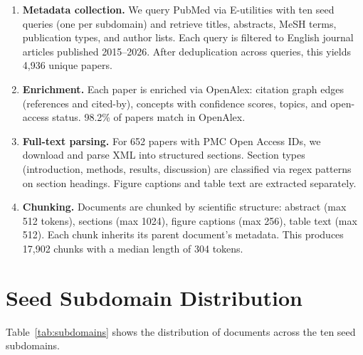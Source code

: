 \documentclass{article}
\begin{document}
\begin{enumerate}[leftmargin=*,itemsep=2pt]
\item \textbf{Metadata collection.} We query PubMed via E-utilities with ten seed queries (one per subdomain) and retrieve titles, abstracts, MeSH terms, publication types, and author lists. Each query is filtered to English journal articles published 2015--2026. After deduplication across queries, this yields 4,936 unique papers.

\item \textbf{Enrichment.} Each paper is enriched via OpenAlex: citation graph edges (references and cited-by), concepts with confidence scores, topics, and open-access status. 98.2\% of papers match in OpenAlex.

\item \textbf{Full-text parsing.} For 652 papers with PMC Open Access IDs, we download and parse XML into structured sections. Section types (introduction, methods, results, discussion) are classified via regex patterns on section headings. Figure captions and table text are extracted separately.

\item \textbf{Chunking.} Documents are chunked by scientific structure: abstract (max 512 tokens), sections (max 1024), figure captions (max 256), table text (max 512). Each chunk inherits its parent document's metadata. This produces 17,902 chunks with a median length of 304 tokens.
\end{enumerate}

\section{Seed Subdomain Distribution}
\label{app:subdomains}

Table~\ref{tab:subdomains} shows the distribution of documents across the ten seed subdomains.
\end{document}
